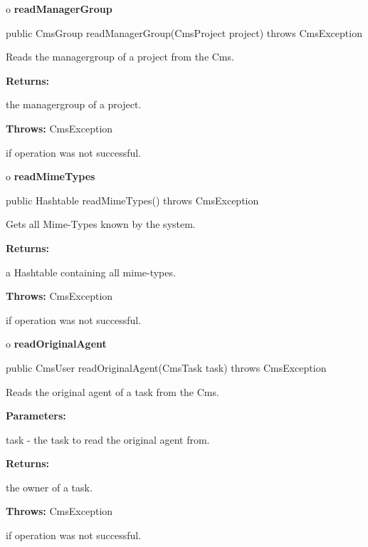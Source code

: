 o {\bf readManagerGroup} 

\begin{PRE}
 public CmsGroup readManagerGroup(CmsProject project) throws CmsException
\end{PRE}

\begin{description}
\htmlDD Reads the managergroup of a project from the Cms. 

\begin{description}
\item {\bf Returns:}  

the managergroup of a project.  
\item {\bf Throws:} CmsException  

if operation was not successful.  
\end{description}

\end{description}

o {\bf readMimeTypes} 

\begin{PRE}
 public Hashtable readMimeTypes() throws CmsException
\end{PRE}

\begin{description}
\htmlDD Gets all Mime-Types known by the system. 

\begin{description}
\item {\bf Returns:}  

a Hashtable containing all mime-types.  
\item {\bf Throws:} CmsException  

if operation was not successful.  
\end{description}

\end{description}

o {\bf readOriginalAgent} 

\begin{PRE}
 public CmsUser readOriginalAgent(CmsTask task) throws CmsException
\end{PRE}

\begin{description}
\htmlDD Reads the original agent of a task from the Cms. 

\begin{description}
\item {\bf Parameters:}  

task - the task to read the original agent from.  
\item {\bf Returns:}  

the owner of a task.  
\item {\bf Throws:} CmsException  

if operation was not successful.  
\end{description}

\end{description}

